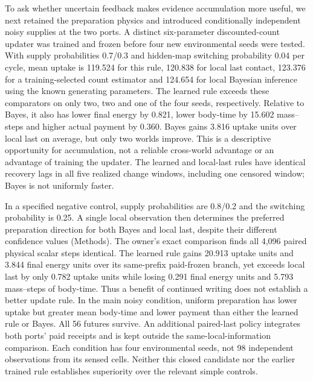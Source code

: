 To ask whether uncertain feedback makes evidence accumulation more useful, we next retained the preparation physics and introduced conditionally independent noisy supplies at the two ports. A distinct six-parameter discounted-count updater was trained and frozen before four new environmental seeds were tested. With supply probabilities 0.7/0.3 and hidden-map switching probability 0.04 per cycle, mean uptake is 119.524 for this rule, 120.838 for local last contact, 123.376 for a training-selected count estimator and 124.654 for local Bayesian inference using the known generating parameters. The learned rule exceeds these comparators on only two, two and one of the four seeds, respectively. Relative to Bayes, it also has lower final energy by 0.821, lower body-time by 15.602 mass--steps and higher actual payment by 0.360. Bayes gains 3.816 uptake units over local last on average, but only two worlds improve. This is a descriptive opportunity for accumulation, not a reliable cross-world advantage or an advantage of training the updater. The learned and local-last rules have identical recovery lags in all five realized change windows, including one censored window; Bayes is not uniformly faster.

In a specified negative control, supply probabilities are 0.8/0.2 and the switching probability is 0.25. A single local observation then determines the preferred preparation direction for both Bayes and local last, despite their different confidence values (Methods). The owner's exact comparison finds all 4,096 paired physical scalar steps identical. The learned rule gains 20.913 uptake units and 3.844 final energy units over its same-prefix paid-frozen branch, yet exceeds local last by only 0.782 uptake units while losing 0.291 final energy units and 5.793 mass--steps of body-time. Thus a benefit of continued writing does not establish a better update rule. In the main noisy condition, uniform preparation has lower uptake but greater mean body-time and lower payment than either the learned rule or Bayes. All 56 futures survive. An additional paired-last policy integrates both ports' paid receipts and is kept outside the same-local-information comparison. Each condition has four environmental seeds, not 98 independent observations from its sensed cells. Neither this closed candidate nor the earlier trained rule establishes superiority over the relevant simple controls.

